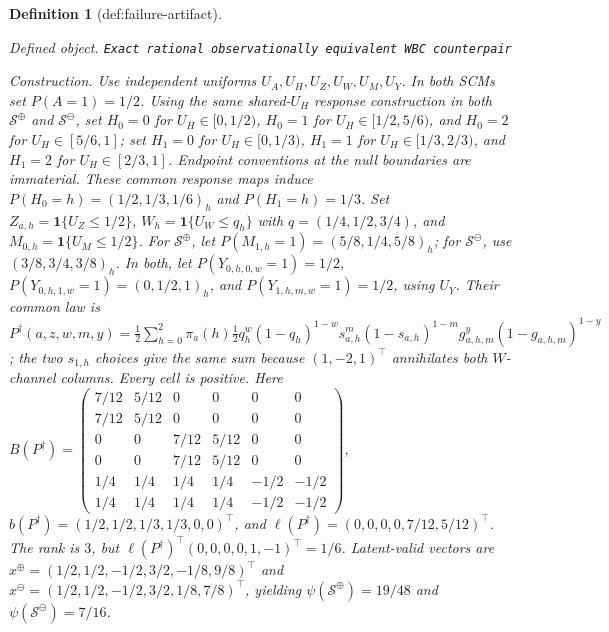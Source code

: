 \documentclass{article}
\newtheorem{definition}{Definition}
\begin{document}
\begin{definition}[def:failure-artifact]\label{def:failure-artifact}
\par\smallskip\noindent\emph{Defined object.} \texttt{Exact rational observationally equivalent WBC counterpair}
\par\smallskip\noindent\emph{Construction.} Use independent uniforms \(U_A,U_H,U_Z,U_W,U_M,U_Y\). In both SCMs set \(P(A=1)=1/2\). Using the same shared-\(U_H\) response construction in both \(\mathcal S^{\oplus}\) and \(\mathcal S^{\ominus}\), set \(H_0=0\) for \(U_H\in[0,1/2)\), \(H_0=1\) for \(U_H\in[1/2,5/6)\), and \(H_0=2\) for \(U_H\in[5/6,1]\); set \(H_1=0\) for \(U_H\in[0,1/3)\), \(H_1=1\) for \(U_H\in[1/3,2/3)\), and \(H_1=2\) for \(U_H\in[2/3,1]\). Endpoint conventions at the null boundaries are immaterial. These common response maps induce \(P(H_0=h)=(1/2,1/3,1/6)_h\) and \(P(H_1=h)=1/3\). Set \(Z_{a,h}=\mathbf 1\{U_Z\le1/2\}\), \(W_h=\mathbf 1\{U_W\le q_h\}\) with \(q=(1/4,1/2,3/4)\), and \(M_{0,h}=\mathbf 1\{U_M\le1/2\}\). For \(\mathcal S^{\oplus}\), let \(P(M_{1,h}=1)=(5/8,1/4,5/8)_h\); for \(\mathcal S^{\ominus}\), use \((3/8,3/4,3/8)_h\). In both, let \(P(Y_{0,h,0,w}=1)=1/2\), \(P(Y_{0,h,1,w}=1)=(0,1/2,1)_h\), and \(P(Y_{1,h,m,w}=1)=1/2\), using \(U_Y\). Their common law is \(P^{\dagger}(a,z,w,m,y)=\frac12\sum_{h=0}^2\pi_a(h)\frac12 q_h^w(1-q_h)^{1-w}s_{a,h}^m(1-s_{a,h})^{1-m}g_{a,h,m}^y(1-g_{a,h,m})^{1-y}\); the two \(s_{1,h}\) choices give the same sum because \((1,-2,1)^{\top}\) annihilates both \(W\)-channel columns. Every cell is positive. Here \(B(P^{\dagger})=\begin{pmatrix}7/12&5/12&0&0&0&0\\7/12&5/12&0&0&0&0\\0&0&7/12&5/12&0&0\\0&0&7/12&5/12&0&0\\1/4&1/4&1/4&1/4&-1/2&-1/2\\1/4&1/4&1/4&1/4&-1/2&-1/2\end{pmatrix}\), \(b(P^{\dagger})=(1/2,1/2,1/3,1/3,0,0)^{\top}\), and \(\ell(P^{\dagger})=(0,0,0,0,7/12,5/12)^{\top}\). The rank is \(3\), but \(\ell(P^{\dagger})^{\top}(0,0,0,0,1,-1)^{\top}=1/6\). Latent-valid vectors are \(x^{\oplus}=(1/2,1/2,-1/2,3/2,-1/8,9/8)^{\top}\) and \(x^{\ominus}=(1/2,1/2,-1/2,3/2,1/8,7/8)^{\top}\), yielding \(\psi(\mathcal S^{\oplus})=19/48\) and \(\psi(\mathcal S^{\ominus})=7/16\).
\end{definition}
\end{document}
